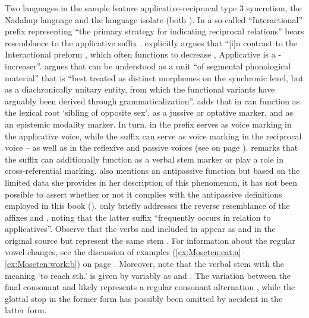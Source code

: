 Two languages in the sample feature applicative-reciprocal type 3 syncretism, the Nadahup language  and the language isolate  (both ). In  a so-called “Interactional” prefix  representing “the primary strategy for indicating reciprocal relations” \citep[487]{epps:2008} bears resemblance to the applicative suffix . \cite[500]{epps:2008} explicitly argues that “[i]n contrast to the Interactional preform , which often functions to decrease , Applicative  is a -increaser”. \cite[119f.]{epps:2008} argues that  can be understood as a unit “of segmental phonological material” that is “best treated as distinct morphemes on the synchronic level, but as a diachronically unitary entity, from which the functional variants have arguably been derived through grammaticalization”. \citeauthor{epps:2008} adds that  in  can function as the lexical root ‘sibling of opposite sex’, as a jussive or optative marker, and as an epistemic modality marker. In turn, in  the prefix  serves as voice marking in the applicative voice, while the suffix  can serve as voice marking in the reciprocal voice -- as well as in the reflexive and passive voices (see  on page \pageref{tab:ch4:pass-refl}). \cite[186, 190, 233ff.]{sakel:2004} remarks that the suffix  can additionally function as a verbal stem marker or play a role in cross-referential marking. \cite[311ff.]{sakel:2004} also mentions an antipassive function but based on the limited data she provides in her description of this phenomenon, it has not been possible to assert whether or not it complies with the antipassive definitions employed in this book (). \cite[233]{sakel:2004} only briefly addresses the reverse resemblance of the affixes  and , noting that the latter suffix “frequently occurs in relation to applicatives”. Observe that the  verbs  and  included in  appear as  and  in the original source but represent the same stem \citep[322]{sakel:2004}. For information about the regular vowel changes, see the discussion of examples (\ref{ex:Moseten:eat:a}--\ref{ex:Moseten:work:b}) on page \pageref{ex:Moseten:eat:a}. Moreover, note that the verbal stem with the meaning ‘to reach sth.’ is given by \cite[121, 391]{sakel:2004} variably as  and . The variation between the final consonant  and  likely represents a regular consonant alternation \citep[48f.]{sakel:2004}, while the glottal stop in the former form has possibly been omitted by accident in the latter form.

